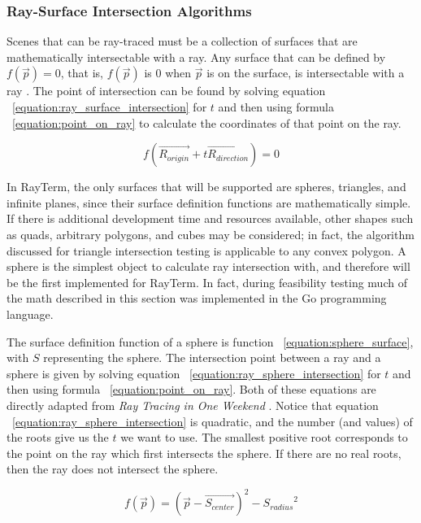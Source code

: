 \documentclass[11pt]{article}
\def\widow#1{\vskip #1\vbadness10000\penalty-200\vskip-#1}
\def\littlesection#1{
  \widow{2cm}
  \vskip 0.5cm
  \noindent{\bf #1}
  \vskip 0.0001cm
}
\newcommand{\name}{{\sc RayTerm}}
\newcommand{\rayorg}{\vec{R_{origin}}}
\newcommand{\raydir}{\vec{R_{direction}}}
\begin{document}
\subsubsection{Ray-Surface Intersection Algorithms}
\label{sec:method:ray_surface_intersection_algorithms}
Scenes that can be ray-traced must be a collection of surfaces that are mathematically intersectable with a ray.
Any surface that can be defined by $f(\vec{p}) = 0$, that is, $f(\vec{p})$ is $0$ when $\vec{p}$ is on the surface, is intersectable with a ray \cite{pharr2016physically}.
The point of intersection can be found by solving equation ~\ref{equation:ray_surface_intersection} for $t$ and then using formula ~\ref{equation:point_on_ray} to calculate the coordinates of that point on the ray.

\begin{equation}
  \label{equation:ray_surface_intersection}
  f(\rayorg + t\raydir) = 0
\end{equation}

In \name, the only surfaces that will be supported are spheres, triangles, and infinite planes, since their surface definition functions are mathematically simple.
If there is additional development time and resources available, other shapes such as quads, arbitrary polygons, and cubes may be considered; in fact, the algorithm discussed for triangle intersection testing is applicable to any convex polygon.
A sphere is the simplest object to calculate ray intersection with, and therefore will be the first implemented for \name.
In fact, during feasibility testing much of the math described in this section was implemented in the Go programming language.

\littlesection{Ray-Sphere Intersection}

The surface definition function of a sphere is function ~\ref{equation:sphere_surface}, with $S$ representing the sphere.
The intersection point between a ray and a sphere is given by solving equation ~\ref{equation:ray_sphere_intersection} for $t$ and then using formula ~\ref{equation:point_on_ray}.
Both of these equations are directly adapted from {\it Ray Tracing in One Weekend} \cite{shirley2016ray}.
Notice that equation ~\ref{equation:ray_sphere_intersection} is quadratic, and the number (and values) of the roots give us the $t$ we want to use.
The smallest positive root corresponds to the point on the ray which first intersects the sphere.
If there are no real roots, then the ray does not intersect the sphere.

\begin{equation}
  \label{equation:sphere_surface}
  f(\vec{p}) = (\vec{p} - \vec{S_{center}})^2 - {S_{radius}}^2
\end{equation}
\end{document}
